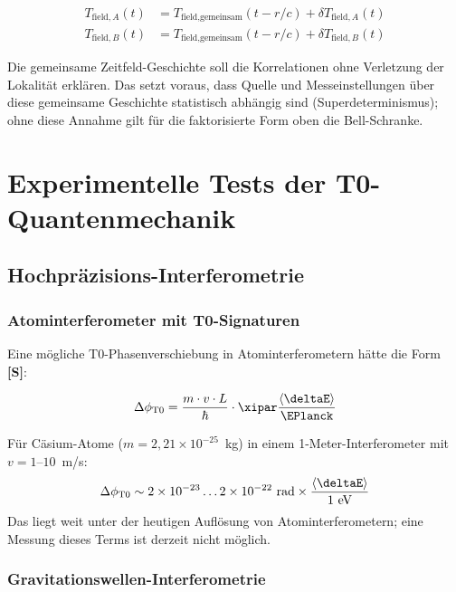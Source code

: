 	\begin{align}
		T_{\text{field},A}(t) &= T_{\text{field},\text{gemeinsam}}(t-r/c) + \delta T_{\text{field},A}(t) \\
		T_{\text{field},B}(t) &= T_{\text{field},\text{gemeinsam}}(t-r/c) + \delta T_{\text{field},B}(t)
	\end{align}
	
	Die gemeinsame Zeitfeld-Geschichte soll die Korrelationen ohne Verletzung der Lokalität erklären. Das setzt voraus, dass Quelle und Messeinstellungen über diese gemeinsame Geschichte statistisch abhängig sind (Superdeterminismus); ohne diese Annahme gilt für die faktorisierte Form oben die Bell-Schranke.
	
	\section{Experimentelle Tests der T0-Quantenmechanik}
	
	\subsection{Hochpräzisions-Interferometrie}
	
	\subsubsection{Atominterferometer mit T0-Signaturen}
	
	Eine mögliche T0-Phasenverschiebung in Atominterferometern hätte die Form \textbf{[S]}:
	
	\begin{equation}
		\Delta\phi_{\text{T0}} = \frac{m \cdot v \cdot L}{\hbar} \cdot \xipar \frac{\langle\deltaE\rangle}{\EPlanck}
	\end{equation}
	
	Für Cäsium-Atome ($m = 2{,}21 \times 10^{-25}$~kg) in einem 1-Meter-Interferometer mit $v = 1$--$10$~m/s:
	\begin{equation}
		\Delta\phi_{\text{T0}} \sim 2 \times 10^{-23} \ldots 2 \times 10^{-22} \text{ rad} \times \frac{\langle\deltaE\rangle}{1 \text{ eV}}
	\end{equation}
	Das liegt weit unter der heutigen Auflösung von Atominterferometern; eine Messung dieses Terms ist derzeit nicht möglich.
	
	\subsubsection{Gravitationswellen-Interferometrie}
	
